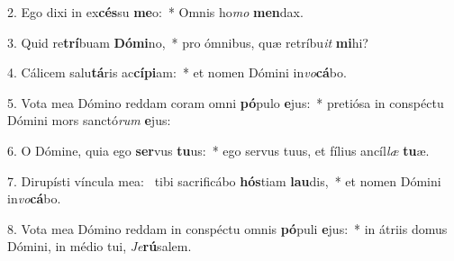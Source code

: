 2. Ego dixi in ex\textbf{cés}su \textbf{me}o:~*  Omnis ho\textit{mo} \textbf{men}dax.\

3. Quid re\textbf{trí}buam \textbf{Dó}\textbf{mi}no,~*  pro ómnibus, quæ retríbu\textit{it} \textbf{mi}hi?\

4. Cálicem salu\textbf{tá}ris ac\textbf{cí}\textbf{pi}am:~*  et nomen Dómini in\textit{vo}\textbf{cá}bo.\

5. Vota mea Dómino reddam coram omni \textbf{pó}pulo \textbf{e}jus:~*  pretiósa in conspéctu Dómini mors sanctó\textit{rum} \textbf{e}jus:\

6. O Dómine, quia ego \textbf{ser}vus \textbf{tu}us:~*  ego servus tuus, et fílius ancíl\textit{læ} \textbf{tu}æ.\

7. Dirupísti víncula mea: \dag\  tibi sacrificábo \textbf{hós}tiam \textbf{lau}dis,~*  et nomen Dómini in\textit{vo}\textbf{cá}bo.\

8. Vota mea Dómino reddam in conspéctu omnis \textbf{pó}puli \textbf{e}jus:~*  in átriis domus Dómini, in médio tui, \textit{Je}\textbf{rú}salem.\

